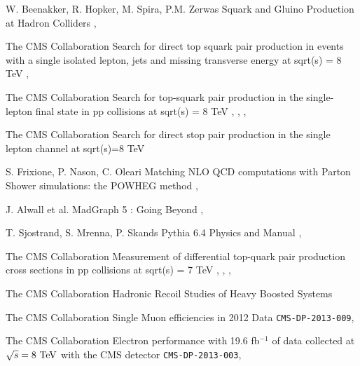{W. Beenakker, R. Hopker, M. Spira, P.M. Zerwas}
{Squark and Gluino Production at Hadron Colliders}
{, }


{The CMS Collaboration}
{Search for direct top squark pair production in events with a single isolated lepton, jets and missing transverse energy at sqrt(s) = 8 TeV}
{, }

{The CMS Collaboration}
{Search for top-squark pair production in the single-lepton final state in pp collisions at sqrt(s) = 8 TeV}
{, , , }

{The CMS Collaboration}
{Search for direct stop pair production in the single lepton channel at sqrt(s)=8 TeV}
{}


{S. Frixione, P. Nason, C. Oleari}
{Matching NLO QCD computations with Parton Shower simulations: the POWHEG method}
{, }

{J. Alwall et al.}
{MadGraph 5 : Going Beyond}
{, }

{T. Sjostrand, S. Mrenna, P. Skands}
{Pythia 6.4 Physics and Manual}
{, }

{The CMS Collaboration}
{Measurement of differential top-quark pair production
cross sections in pp collisions at sqrt(s) = 7 TeV}
{, , , }

{The CMS Collaboration}
{Hadronic Recoil Studies of Heavy Boosted Systems}
{}


{The CMS Collaboration}
{Single Muon efficiencies in 2012 Data}
{\texttt{CMS-DP-2013-009}, }

{The CMS Collaboration}
{Electron performance with 19.6 fb$^{-1}$ of data collected at $\sqrt{s}=8~\text{TeV}$ with the CMS detector}
{\texttt{CMS-DP-2013-003}, }

